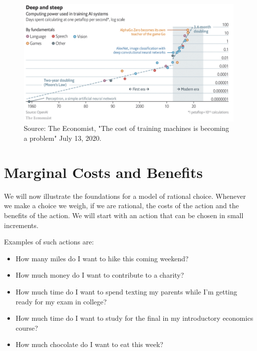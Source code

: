 \documentclass[
]{book}
\providecommand{\tightlist}{%
  \setlength{\itemsep}{0pt}\setlength{\parskip}{0pt}}
\begin{document}
\begin{figure}

{\centering \includegraphics[width=1\linewidth]{img/rationalchoice/mooredeepandsteep} 

}

\caption{Source: The Economist, "The cost of training machines is becoming a problem" July 13, 2020.}\label{fig:rationalchoicemooredeep}
\end{figure}

\hypertarget{marginal-costs-and-benefits}{%
\section{Marginal Costs and Benefits}\label{marginal-costs-and-benefits}}

We will now illustrate the foundations for a model of rational choice. Whenever we make a choice we weigh, if we are rational, the costs of the action and the benefits of the action. We will start with an action that can be chosen in small increments.

Examples of such actions are:

\begin{itemize}
\tightlist
\item
  How many miles do I want to hike this coming weekend?
\item
  How much money do I want to contribute to a charity?
\item
  How much time do I want to spend texting my parents while I'm getting ready for my exam in college?
\item
  How much time do I want to study for the final in my introductory economics course?
\item
  How much chocolate do I want to eat this week?
\end{itemize}
\end{document}

